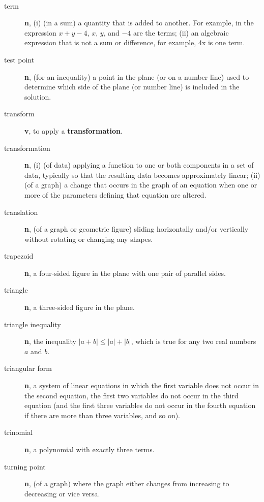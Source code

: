 \documentclass[10pt,]{book}
\newcommand{\terminology}[1]{\textbf{#1}}
\theoremstyle{plain}
\theoremstyle{definition}
\theoremstyle{definition}
\theoremstyle{definition}
\numberwithin{equation}{part}
\newcommand\abs[1]{\left|#1\right|}
\begin{document}
\paragraph[{}]{}\hypertarget{paragraphs-23}{}
\leavevmode%
\begin{description}
\item[{term}]\hypertarget{li-821}{}\terminology{n}, (i) (in a sum) a quantity that is added to another. For example, in the expression \(x + y − 4\), \(x\), \(y\), and \(-4\) are the terms; (ii) an algebraic expression that is not a sum or difference, for example, 4x is one term.%
\item[{test point}]\hypertarget{li-822}{}\terminology{n}, (for an inequality) a point in the plane (or on a number line) used to determine which side of the plane (or number line) is included in the solution.%
\item[{transform}]\hypertarget{li-823}{}\terminology{v}, to apply a \terminology{transformation}.%
\item[{transformation}]\hypertarget{li-824}{}\terminology{n}, (i) (of data) applying a function to one or both components in a set of data, typically so that the resulting data becomes approximately linear; (ii) (of a graph) a change that occurs in the graph of an equation when one or more of the parameters defining that equation are altered.%
\item[{translation}]\hypertarget{li-825}{}\terminology{n}, (of a graph or geometric figure) sliding horizontally and/or vertically without rotating or changing any shapes.%
\item[{trapezoid}]\hypertarget{li-826}{}\terminology{n}, a four-sided figure in the plane with one pair of parallel sides.%
\item[{triangle}]\hypertarget{li-827}{}\terminology{n}, a three-sided figure in the plane.%
\item[{triangle inequality}]\hypertarget{li-828}{}\terminology{n}, the inequality \(\abs{a + b} \le \abs{a} +\abs{b}\), which is true for any two real numbers \(a\) and \(b\).%
\item[{triangular form}]\hypertarget{li-829}{}\terminology{n}, a system of linear equations in which the first variable does not occur in the second equation, the first two variables do not occur in the third equation (and the first three variables do not occur in the fourth equation if there are more than three variables, and so on).%
\item[{trinomial}]\hypertarget{li-830}{}\terminology{n}, a polynomial with exactly three terms.%
\item[{turning point}]\hypertarget{li-831}{}\terminology{n}, (of a graph) where the graph either changes from increasing to decreasing or vice versa.%
\end{description}
%
\typeout{************************************************}
\typeout{************************************************}
\end{document}

